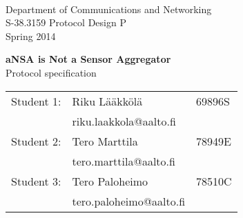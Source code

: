 \begin{titlepage}

\begin{flushleft}
 \\
Department of Communications and Networking \\
S-38.3159 Protocol Design P \\
Spring 2014
\end{flushleft}

\vspace{8cm}
\begin{center}
  {\LARGE \textbf{aNSA is Not a Sensor Aggregator}}\\
  {\LARGE Protocol specification}
\end{center}

\vfill

\begin{center}
\begin{tabular}{rll}
	Student 1:	& Riku Lääkkölä 	& 69896S \\
				& riku.laakkola@aalto.fi & \\    
    Student 2: 	& Tero Marttila		& 78949E \\
    			& tero.marttila@aalto.fi & \\
    Student 3:	& Tero Paloheimo	& 78510C \\
    			& tero.paloheimo@aalto.fi & \\
\end{tabular}
\end{center}

\end{titlepage}